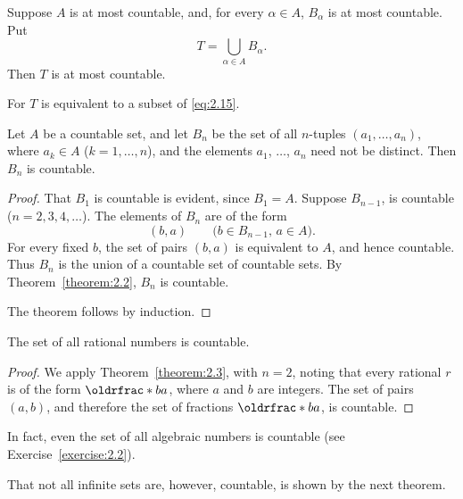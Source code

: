 \begin{corollary}
    Suppose \(A\) is at most countable, and, for every \(\alpha\in A\), \(B_\alpha\) is at most countable. Put
    \begin{equation*}
        T=\bigcup_{\alpha\in A}B_\alpha.
    \end{equation*}
    Then \(T\) is at most countable.
\end{corollary}

For \(T\) is equivalent to a subset of \eqref{eq:2.15}.

\begin{theorem}\label{theorem:2.3}
    Let \(A\) be a countable set, and let \(B_n\) be the set of all \(n\)-tuples \(\left(a_1,\ldots,a_n\right)\), where \(a_k\in A\) (\(k=1,\ldots,n\)), and the elements \(a_1\), \(\ldots\), \(a_n\) need not be distinct. Then \(B_n\) is countable.
\end{theorem}

\begin{proof}
    That \(B_1\) is countable is evident, since \(B_1=A\). Suppose \(B_{n-1}\), is countable (\(n=2,3,4,\ldots\)). The elements of \(B_n\) are of the form
    \begin{equation}
        \left(b,a\right)\qquad\text{(\(b\in B_{n-1}\), \(a\in A\))}.
    \end{equation}
    For every fixed \(b\), the set of pairs \(\left(b,a\right)\) is equivalent to \(A\), and hence countable. Thus \(B_n\) is the union of a countable set of countable sets. By Theorem~\ref{theorem:2.2}, \(B_n\) is countable.

    The theorem follows by induction.
\end{proof}

\begin{corollary}
    The set of all rational numbers is countable.
\end{corollary}

\begin{proof}
    We apply Theorem~\ref{theorem:2.3}, with \(n=2\), noting that every rational \(r\) is of the form \(\rfrac{b}{a}\), where \(a\) and \(b\) are integers. The set of pairs \(\left(a,b\right)\), and therefore the set of fractions \(\rfrac{b}{a}\), is countable.
\end{proof}

In fact, even the set of all algebraic numbers is countable (see Exercise~\ref{exercise:2.2}).

That not all infinite sets are, however, countable, is shown by the next theorem.

